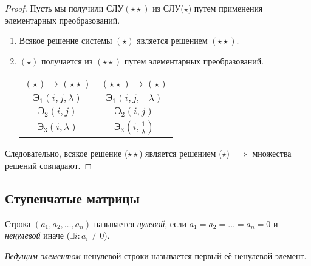\begin{proof}
    Пусть мы получили СЛУ$(\star\star)$ из СЛУ($\star$) путем применения элементарных преобразований.

    \begin{enumerate}[nosep]
    \item
        Всякое решение системы $(\star)$ является решением $(\star\star)$.
    \item
        $(\star)$ получается из $(\star\star)$ путем элементарных преобразований.

        \begin{tabular}{c|c}
            $(\star) \to (\star\star)$ & $(\star\star) \to (\star)$ \\
            \hline
            $\text{Э}_1(i, j, \lambda)$ & $\text{Э}_1(i, j, -\lambda)$ \\
            $\text{Э}_2(i, j)$ & $\text{Э}_2(i, j)$ \\
            $\text{Э}_3(i, \lambda)$ & $\text{Э}_3(i, \frac{1}{\lambda})$
        \end{tabular}
    \end{enumerate}

    Следовательно, всякое решение ($\star\star$) является решением ($\star$) $\implies$ множества решений совпадают.
\end{proof}


\subsection{Ступенчатые матрицы}

\begin{definition}
    Строка $(a_1, a_2, \dots, a_n)$ называется \textit{нулевой}, если $a_1 = a_2 = \dots = a_n = 0$ и \textit{ненулевой} иначе ($\exists i : a_i \neq 0$).
\end{definition}

\begin{definition}
    \textit{Ведущим элементом} ненулевой строки называется первый её ненулевой элемент.
\end{definition}

